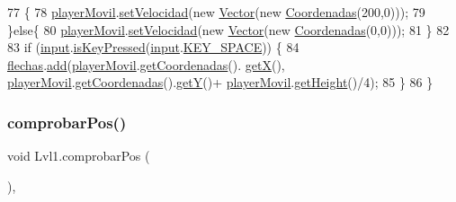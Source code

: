\begin{DoxyCode}
77 \{
78     \mbox{\hyperlink{class_lvl1_a7ac9bfa1d79eb27089228a152072efd2}{playerMovil}}.\mbox{\hyperlink{class_sprite_movil_ad1477094c3bcef96fa83b7582f03ecb9}{setVelocidad}}(\textcolor{keyword}{new} \mbox{\hyperlink{class_vector}{Vector}}(\textcolor{keyword}{new} 
      \mbox{\hyperlink{class_coordenadas}{Coordenadas}}(200,0)));
79 \}\textcolor{keywordflow}{else}\{
80     \mbox{\hyperlink{class_lvl1_a7ac9bfa1d79eb27089228a152072efd2}{playerMovil}}.\mbox{\hyperlink{class_sprite_movil_ad1477094c3bcef96fa83b7582f03ecb9}{setVelocidad}}(\textcolor{keyword}{new} \mbox{\hyperlink{class_vector}{Vector}}(\textcolor{keyword}{new} 
      \mbox{\hyperlink{class_coordenadas}{Coordenadas}}(0,0)));
81 \}
82 
83         \textcolor{keywordflow}{if} (\mbox{\hyperlink{class_lvl1_abd0692137420767ebe0bb0b3d5b2cfd8}{input}}.\mbox{\hyperlink{classorg_1_1newdawn_1_1slick_1_1_input_a235ecf083734d727c4de50441b082649}{isKeyPressed}}(\mbox{\hyperlink{class_lvl1_abd0692137420767ebe0bb0b3d5b2cfd8}{input}}.\mbox{\hyperlink{classorg_1_1newdawn_1_1slick_1_1_input_ae9b39721a7b669da9c87454285cb7c5f}{KEY\_SPACE}})) \{
84             \mbox{\hyperlink{class_lvl1_a252ada5a964b9a5b559aaa0773cb5643}{flechas}}.\mbox{\hyperlink{class_controlador_flechas_a0f13f2616d99a402e2b5fe2385dd208f}{add}}(\mbox{\hyperlink{class_lvl1_a7ac9bfa1d79eb27089228a152072efd2}{playerMovil}}.\mbox{\hyperlink{class_sprite_a1ea85b8bbd32ba06d279b76b3ffad9e0}{getCoordenadas}}().
      \mbox{\hyperlink{class_coordenadas_a7b3fc725f9146220813dc0084fecc3ca}{getX}}(), \mbox{\hyperlink{class_lvl1_a7ac9bfa1d79eb27089228a152072efd2}{playerMovil}}.\mbox{\hyperlink{class_sprite_a1ea85b8bbd32ba06d279b76b3ffad9e0}{getCoordenadas}}().\mbox{\hyperlink{class_coordenadas_aa10f46c8c62df3db3a05d4550f20b197}{getY}}()+
      \mbox{\hyperlink{class_lvl1_a7ac9bfa1d79eb27089228a152072efd2}{playerMovil}}.\mbox{\hyperlink{classorg_1_1newdawn_1_1slick_1_1_image_aa2594a93f5126f60ad8a72444fceee98}{getHeight}}()/4);
85         \}
86     \}
\end{DoxyCode}
\mbox{\label{class_lvl1_a78b06f34feedd942b1af193cedb0ed1e}} 
\subsubsection{\texorpdfstring{comprobar\+Pos()}{comprobarPos()}}
{\footnotesize\ttfamily void Lvl1.\+comprobar\+Pos (\begin{DoxyParamCaption}{ }\end{DoxyParamCaption})\hspace{0.3cm}{\ttfamily [inline]}, {\ttfamily [private]}}


